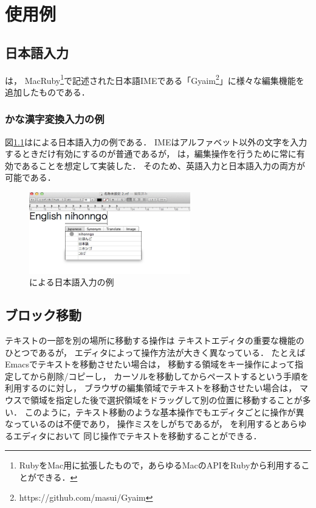 \chapter{{\system}使用例}


\section{日本語入力}

{\system}は，
MacRuby\footnote{
  RubyをMac用に拡張したもので，あらゆるMacのAPIをRubyから利用することができる．
}で記述された日本語IMEである「Gyaim\footnote{
 \textsf{https://github.com/masui/Gyaim}
}」に様々な編集機能を追加したものである．
%

\subsection{かな漢字変換入力の例}
図\ref{japaneseinput}は{\system}による日本語入力の例である．
IMEはアルファベット以外の文字を入力するときだけ有効にするのが普通であるが，
{\system}は，編集操作を行うために常に有効であることを想定して実装した．
そのため、英語入力と日本語入力の両方が可能である．

\begin{figure}[H]
\centerline{\includegraphics[width=70mm,bb=0 0 600 320]{figures/japanese.png}}
\caption{{\system}による日本語入力の例}
\label{japaneseinput}
\end{figure}

\section{ブロック移動}

テキストの一部を別の場所に移動する操作は
テキストエディタの重要な機能のひとつであるが，
エディタによって操作方法が大きく異なっている．
たとえばEmacsでテキストを移動させたい場合は，
移動する領域をキー操作によって指定してから削除/コピーし，
カーソルを移動してからペーストするという手順を利用するのに対し，
ブラウザの編集領域でテキストを移動させたい場合は，
マウスで領域を指定した後で選択領域をドラッグして別の位置に移動することが多い．
このように，テキスト移動のような基本操作でもエディタごとに操作が異なっているのは不便であり，
操作ミスをしがちであるが，
{\system}を利用するとあらゆるエディタにおいて
同じ操作でテキストを移動することができる．


